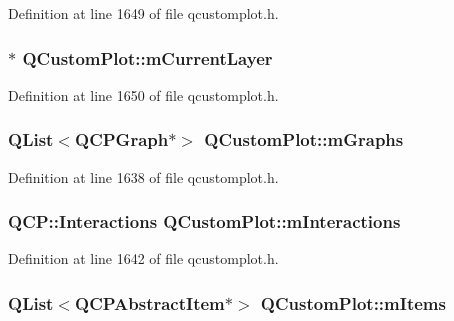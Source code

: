 Definition at line 1649 of file qcustomplot.\-h.

\hypertarget{class_q_custom_plot_aa27569c92e74395af10151357d268628}{
\subsubsection[{m\-Current\-Layer}]{$\ast$ Q\-Custom\-Plot\-::m\-Current\-Layer\hspace{0.3cm}{\ttfamily [protected]}}}\label{class_q_custom_plot_aa27569c92e74395af10151357d268628}


Definition at line 1650 of file qcustomplot.\-h.

\hypertarget{class_q_custom_plot_adaf8d407d72a725169d7dbed2ee386bb}{
\subsubsection[{m\-Graphs}]{\setlength{\rightskip}{0pt plus 5cm}Q\-List$<${\bf Q\-C\-P\-Graph}$\ast$$>$ Q\-Custom\-Plot\-::m\-Graphs\hspace{0.3cm}{\ttfamily [protected]}}}\label{class_q_custom_plot_adaf8d407d72a725169d7dbed2ee386bb}


Definition at line 1638 of file qcustomplot.\-h.

\hypertarget{class_q_custom_plot_ad717377ceba7493b4b32f0bcbbdf1895}{
\subsubsection[{m\-Interactions}]{\setlength{\rightskip}{0pt plus 5cm}Q\-C\-P\-::\-Interactions Q\-Custom\-Plot\-::m\-Interactions\hspace{0.3cm}{\ttfamily [protected]}}}\label{class_q_custom_plot_ad717377ceba7493b4b32f0bcbbdf1895}


Definition at line 1642 of file qcustomplot.\-h.

\hypertarget{class_q_custom_plot_a6a93905372326e31e98d6c3bc8953ec8}{
\subsubsection[{m\-Items}]{\setlength{\rightskip}{0pt plus 5cm}Q\-List$<${\bf Q\-C\-P\-Abstract\-Item}$\ast$$>$ Q\-Custom\-Plot\-::m\-Items\hspace{0.3cm}{\ttfamily [protected]}}}\label{class_q_custom_plot_a6a93905372326e31e98d6c3bc8953ec8}


